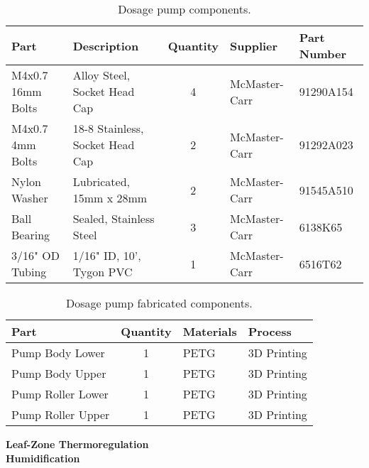 \begin{table}[!ht]
    \centering
    \begin{tabular}{|l|l|c|l|l|}
    \hline
        Part                & Description                       & Quantity  & Supplier      & Part Number   \\ \hline
        M4x0.7 16mm Bolts   & Alloy Steel, Socket Head Cap      & 4         & McMaster-Carr & 91290A154     \\ \hline
        M4x0.7 4mm Bolts    & 18-8 Stainless, Socket Head Cap   & 2         & McMaster-Carr & 91292A023     \\ \hline
        Nylon Washer        & Lubricated, 15mm x 28mm           & 2         & McMaster-Carr & 91545A510     \\ \hline
        Ball Bearing        & Sealed, Stainless Steel           & 3         & McMaster-Carr & 6138K65       \\ \hline
        3/16" OD Tubing     & 1/16" ID, 10', Tygon PVC          & 1         & McMaster-Carr & 6516T62       \\ \hline
    \end{tabular}
    \caption{Dosage pump components.}
    \label{tab:aeroponics_dosagepump_parts}
\end{table}

\begin{table}[!ht]
    \centering
    \begin{tabular}{|l|c|l|l|}
    \hline
        Part                & Quantity  & Materials & Process       \\ \hline
        Pump Body Lower     & 1         & PETG      & 3D Printing   \\ \hline
        Pump Body Upper     & 1         & PETG      & 3D Printing   \\ \hline
        Pump Roller Lower   & 1         & PETG      & 3D Printing   \\ \hline
        Pump Roller Upper   & 1         & PETG      & 3D Printing   \\ \hline
    \end{tabular}
    \caption{Dosage pump fabricated components.}
    \label{tab:aeroponics_dosagepump_fabrication}
\end{table}

\clearpage

\textbf{Leaf-Zone Thermoregulation}\\


\textbf{Humidification}\\


